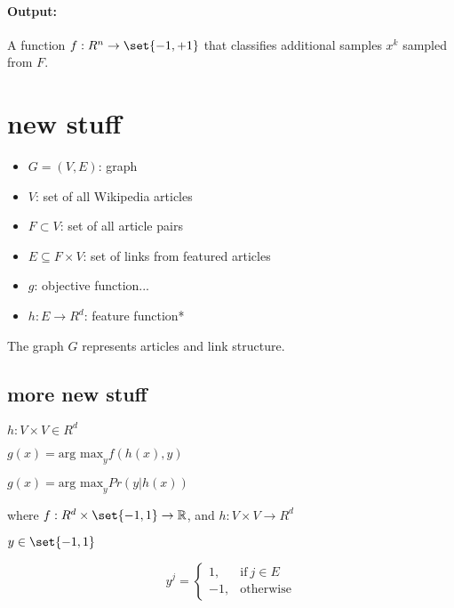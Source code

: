 

\paragraph{Output:}
A function $f: R^n \to \set{-1,+1}$ that classifies additional samples ${x^k}$ sampled from $F$.



\section{new stuff}


\begin{itemize}
\item $G = (V, E)$: graph
\item $V$: set of all Wikipedia articles
\item $F \subset V$: set of all article pairs
\item $E \subseteq F \times V$: set of links from featured articles
\item $g$: objective function...
\item $h: E \to R^d$: feature function*
\end{itemize}


The graph $G$ represents articles and link structure.


\subsection{more new stuff}

$h: V \times V \in R^d$ %

$g(x) = \text{arg max}_y f(h(x), y)$

$g(x) = \text{arg max}_y Pr(y | h(x))$

where $f: R^d \times \set{-1,1} \to \mathbb{R}$, and $h: V \times V \to R^d$

$y \in \set{-1,1}$

\begin{equation}
  y^j =
  \begin{cases}
    1, & \text{if}\ j \in E \\
    -1, & \text{otherwise}
  \end{cases}
\end{equation}

